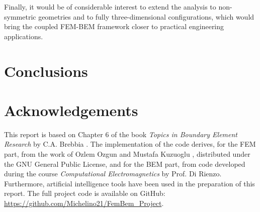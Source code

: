 \documentclass[11pt,onecolumn]{article}
\begin{document}
Finally, it would be of considerable interest to extend the analysis to non-symmetric geometries and to fully three-dimensional configurations, which would bring the coupled FEM-BEM framework closer to practical engineering applications.
\section{Conclusions}

\section{Acknowledgements}

This report is based on Chapter 6 of the book \textit{Topics in Boundary Element Research} by C.A. Brebbia \cite{brebbia1990}. 
The implementation of the code derives, for the FEM part, from the work of Ozlem Ozgun and Mustafa Kuzuoglu \cite{ozgun2018}, distributed under the GNU General Public License, and for the BEM part, from code developed during the course \textit{Computational Electromagnetics} by Prof. Di Rienzo. 
Furthermore, artificial intelligence tools have been used in the preparation of this report. The full project code is available on GitHub: \url{https://github.com/Michelino21/FemBem_Project}.


\newpage

\newpage
\end{document}
